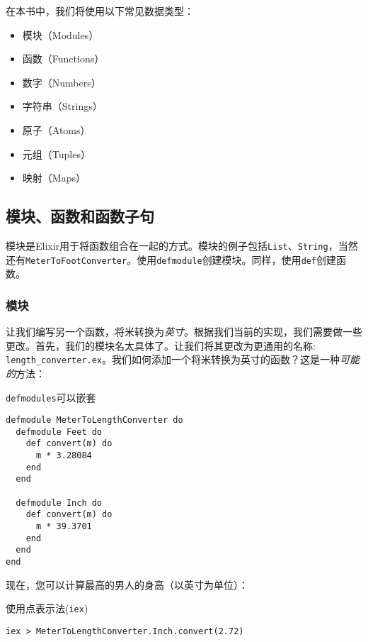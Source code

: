 在本书中，我们将使用以下常见数据类型：

\begin{itemize}

\item  模块（Modules）
\item  函数（Functions）
\item  数字（Numbers）
\item  字符串（Strings）
\item  原子（Atoms）
\item  元组（Tuples）
\item  映射（Maps）
\end{itemize}

\subsection{模块、函数和函数子句}

模块是Elixir用于将函数组合在一起的方式。模块的例子包括\texttt{List}、\texttt{String}，当然还有\texttt{MeterToFootConverter}。使用\texttt{defmodule}创建模块。同样，使用\texttt{def}创建函数。


\subsubsection{模块}

让我们编写另一个函数，将米转换为\emph{英寸}。根据我们当前的实现，我们需要做一些更改。首先，我们的模块名太具体了。让我们将其更改为更通用的名称: \texttt{length\_converter.ex}。我们如何添加一个将米转换为英寸的函数？这是一种\emph{可能的}方法：


\begin{code}{\texttt{defmodules}可以嵌套}
\begin{verbatim}
defmodule MeterToLengthConverter do
  defmodule Feet do
    def convert(m) do
      m * 3.28084
    end
  end

  defmodule Inch do
    def convert(m) do
      m * 39.3701
    end
  end
end
\end{verbatim}
\label{lst:defmodules_can_be_nested}
\end{code}

现在，您可以计算最高的男人的身高（以英寸为单位）：

\begin{code}{使用点表示法(\texttt{iex})}
\begin{verbatim}
iex > MeterToLengthConverter.Inch.convert(2.72)
\end{verbatim}
\label{lst:use_dot_notation}
\end{code}

